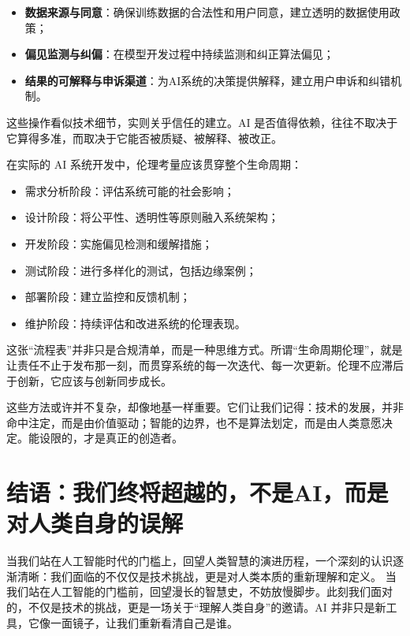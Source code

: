 \begin{itemize}
\item {\bf 数据来源与同意}：确保训练数据的合法性和用户同意，建立透明的数据使用政策；
\item {\bf 偏见监测与纠偏}：在模型开发过程中持续监测和纠正算法偏见；
\item {\bf 结果的可解释与申诉渠道}：为AI系统的决策提供解释，建立用户申诉和纠错机制。
\end{itemize}

这些操作看似技术细节，实则关乎信任的建立。AI 是否值得依赖，往往不取决于它算得多准，而取决于它能否被质疑、被解释、被改正。


在实际的 AI 系统开发中，伦理考量应该贯穿整个生命周期：

\begin{itemize}
\item 需求分析阶段：评估系统可能的社会影响；
\item 设计阶段：将公平性、透明性等原则融入系统架构；
\item 开发阶段：实施偏见检测和缓解措施；
\item 测试阶段：进行多样化的测试，包括边缘案例；
\item 部署阶段：建立监控和反馈机制；
\item 维护阶段：持续评估和改进系统的伦理表现。
\end{itemize}

这张“流程表”并非只是合规清单，而是一种思维方式。所谓“生命周期伦理”，就是让责任不止于发布那一刻，而贯穿系统的每一次迭代、每一次更新。伦理不应滞后于创新，它应该与创新同步成长。

这些方法或许并不复杂，却像地基一样重要。它们让我们记得：技术的发展，并非命中注定，而是由价值驱动；智能的边界，也不是算法划定，而是由人类意愿决定。能设限的，才是真正的创造者。

\section*{结语：我们终将超越的，不是AI，而是对人类自身的误解}

当我们站在人工智能时代的门槛上，回望人类智慧的演进历程，一个深刻的认识逐渐清晰：我们面临的不仅仅是技术挑战，更是对人类本质的重新理解和定义。
当我们站在人工智能的门槛前，回望漫长的智慧史，不妨放慢脚步。此刻我们面对的，不仅是技术的挑战，更是一场关于“理解人类自身”的邀请。AI 并非只是新工具，它像一面镜子，让我们重新看清自己是谁。

